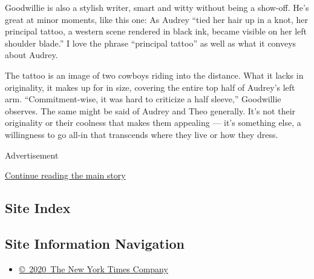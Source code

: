 Goodwillie is also a stylish writer, smart and witty without being a
show-off. He's great at minor moments, like this one: As Audrey ``tied
her hair up in a knot, her principal tattoo, a western scene rendered in
black ink, became visible on her left shoulder blade.'' I love the
phrase ``principal tattoo'' as well as what it conveys about Audrey.

The tattoo is an image of two cowboys riding into the distance. What it
lacks in originality, it makes up for in size, covering the entire top
half of Audrey's left arm. ``Commitment-wise, it was hard to criticize a
half sleeve,'' Goodwillie observes. The same might be said of Audrey and
Theo generally. It's not their originality or their coolness that makes
them appealing --- it's something else, a willingness to go all-in that
transcends where they live or how they dress.

Advertisement

\protect\hyperlink{after-bottom}{Continue reading the main story}

\hypertarget{site-index}{%
\subsection{Site Index}\label{site-index}}

\hypertarget{site-information-navigation}{%
\subsection{Site Information
Navigation}\label{site-information-navigation}}

\begin{itemize}
\tightlist
\item
  \href{https://help.nytimes3xbfgragh.onion/hc/en-us/articles/115014792127-Copyright-notice}{©~2020~The
  New York Times Company}
\end{itemize}

